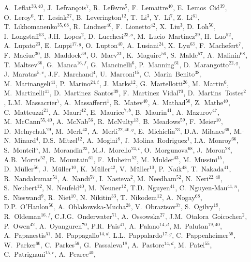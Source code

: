 \documentclass[12pt,a4paper]{article}
\begin{document}
\begin{flushleft}
A.~Leflat$^{33,40}$,
J.~Lefran{\c{c}}ois$^{7}$,
R.~Lef{\`e}vre$^{5}$,
F.~Lemaitre$^{40}$,
E.~Lemos~Cid$^{39}$,
O.~Leroy$^{6}$,
T.~Lesiak$^{27}$,
B.~Leverington$^{12}$,
T.~Li$^{3}$,
Y.~Li$^{7}$,
Z.~Li$^{61}$,
T.~Likhomanenko$^{35,68}$,
R.~Lindner$^{40}$,
F.~Lionetto$^{42}$,
X.~Liu$^{3}$,
D.~Loh$^{50}$,
I.~Longstaff$^{53}$,
J.H.~Lopes$^{2}$,
D.~Lucchesi$^{23,o}$,
M.~Lucio~Martinez$^{39}$,
H.~Luo$^{52}$,
A.~Lupato$^{23}$,
E.~Luppi$^{17,g}$,
O.~Lupton$^{40}$,
A.~Lusiani$^{24}$,
X.~Lyu$^{63}$,
F.~Machefert$^{7}$,
F.~Maciuc$^{30}$,
B.~Maddock$^{59}$,
O.~Maev$^{31}$,
K.~Maguire$^{56}$,
S.~Malde$^{57}$,
A.~Malinin$^{68}$,
T.~Maltsev$^{36}$,
G.~Manca$^{16,f}$,
G.~Mancinelli$^{6}$,
P.~Manning$^{61}$,
D.~Marangotto$^{22,q}$,
J.~Maratas$^{5,v}$,
J.F.~Marchand$^{4}$,
U.~Marconi$^{15}$,
C.~Marin~Benito$^{38}$,
M.~Marinangeli$^{41}$,
P.~Marino$^{24,t}$,
J.~Marks$^{12}$,
G.~Martellotti$^{26}$,
M.~Martin$^{6}$,
M.~Martinelli$^{41}$,
D.~Martinez~Santos$^{39}$,
F.~Martinez~Vidal$^{70}$,
D.~Martins~Tostes$^{2}$,
L.M.~Massacrier$^{7}$,
A.~Massafferri$^{1}$,
R.~Matev$^{40}$,
A.~Mathad$^{50}$,
Z.~Mathe$^{40}$,
C.~Matteuzzi$^{21}$,
A.~Mauri$^{42}$,
E.~Maurice$^{7,b}$,
B.~Maurin$^{41}$,
A.~Mazurov$^{47}$,
M.~McCann$^{55,40}$,
A.~McNab$^{56}$,
R.~McNulty$^{13}$,
B.~Meadows$^{59}$,
F.~Meier$^{10}$,
D.~Melnychuk$^{29}$,
M.~Merk$^{43}$,
A.~Merli$^{22,40,q}$,
E.~Michielin$^{23}$,
D.A.~Milanes$^{66}$,
M.-N.~Minard$^{4}$,
D.S.~Mitzel$^{12}$,
A.~Mogini$^{8}$,
J.~Molina~Rodriguez$^{1}$,
I.A.~Monroy$^{66}$,
S.~Monteil$^{5}$,
M.~Morandin$^{23}$,
M.J.~Morello$^{24,t}$,
O.~Morgunova$^{68}$,
J.~Moron$^{28}$,
A.B.~Morris$^{52}$,
R.~Mountain$^{61}$,
F.~Muheim$^{52}$,
M.~Mulder$^{43}$,
M.~Mussini$^{15}$,
D.~M{\"u}ller$^{56}$,
J.~M{\"u}ller$^{10}$,
K.~M{\"u}ller$^{42}$,
V.~M{\"u}ller$^{10}$,
P.~Naik$^{48}$,
T.~Nakada$^{41}$,
R.~Nandakumar$^{51}$,
A.~Nandi$^{57}$,
I.~Nasteva$^{2}$,
M.~Needham$^{52}$,
N.~Neri$^{22,40}$,
S.~Neubert$^{12}$,
N.~Neufeld$^{40}$,
M.~Neuner$^{12}$,
T.D.~Nguyen$^{41}$,
C.~Nguyen-Mau$^{41,n}$,
S.~Nieswand$^{9}$,
R.~Niet$^{10}$,
N.~Nikitin$^{33}$,
T.~Nikodem$^{12}$,
A.~Nogay$^{68}$,
D.P.~O'Hanlon$^{50}$,
A.~Oblakowska-Mucha$^{28}$,
V.~Obraztsov$^{37}$,
S.~Ogilvy$^{19}$,
R.~Oldeman$^{16,f}$,
C.J.G.~Onderwater$^{71}$,
A.~Ossowska$^{27}$,
J.M.~Otalora~Goicochea$^{2}$,
P.~Owen$^{42}$,
A.~Oyanguren$^{70}$,
P.R.~Pais$^{41}$,
A.~Palano$^{14,d}$,
M.~Palutan$^{19,40}$,
A.~Papanestis$^{51}$,
M.~Pappagallo$^{14,d}$,
L.L.~Pappalardo$^{17,g}$,
C.~Pappenheimer$^{59}$,
W.~Parker$^{60}$,
C.~Parkes$^{56}$,
G.~Passaleva$^{18}$,
A.~Pastore$^{14,d}$,
M.~Patel$^{55}$,
C.~Patrignani$^{15,e}$,
A.~Pearce$^{40}$,

\end{flushleft}
\end{document}
